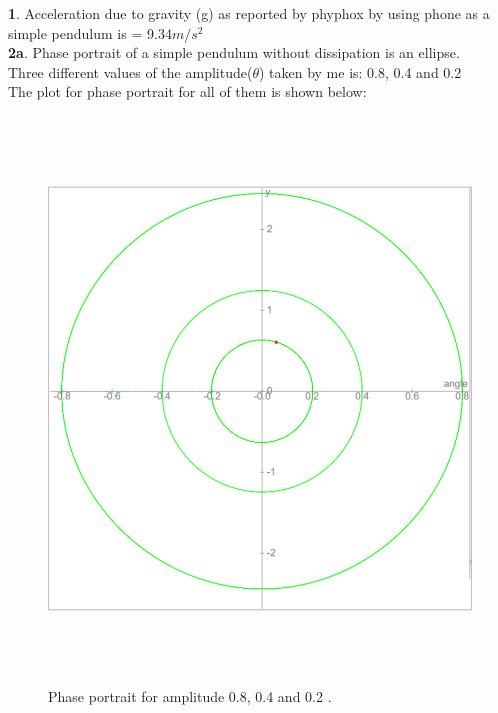 \documentclass[11pt]{scrartcl} %
\begin{document}
\textbf{1}.
Acceleration due to gravity (g) as reported by phyphox by using phone as a simple pendulum is = 9.34$m/s^2$\\

\textbf{2a}.
Phase portrait of a simple pendulum without dissipation is an ellipse.\\
Three different values of the amplitude($\theta$) taken by me is: 0.8, 0.4 and 0.2\\

The plot for phase portrait for all of them is shown below:

\begin{figure}[h] %
	\centering
	\includegraphics[width=\textwidth, height=15cm]{2a.PNG} %
	\caption{Phase portrait for amplitude 0.8, 0.4 and 0.2 .}
\end{figure}
\end{document}
